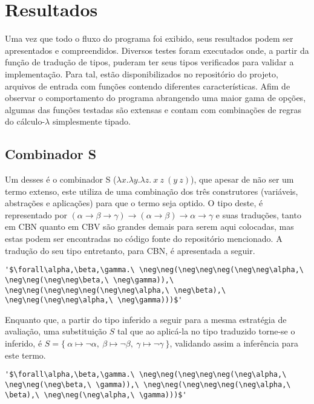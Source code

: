 \section{Resultados}\label{sec:resultados}
Uma vez que todo o fluxo do programa foi exibido, seus resultados podem ser apresentados e compreendidos.
Diversos testes foram executados onde, a partir da função de tradução de tipos, puderam ter seus tipos verificados para validar a implementação.
Para tal, estão disponibilizados no repositório do projeto, arquivos de entrada com funções contendo diferentes características.
Afim de observar o comportamento do programa abrangendo uma maior gama de opções, algumas das funções testadas são extensas e contam com combinações de regras do cálculo-$\lambda$ simplesmente tipado.

\subsection{Combinador S}
Um desses é o combinador S ($\lambda x.\lambda y.\lambda z.\ x\ z\ (y\ z)$), que apesar de não ser um termo extenso, este utiliza de uma combinação dos três construtores (variáveis, abstrações e aplicações) para que o termo seja optido.
O tipo deste, é representado por $(\alpha \to \beta \to \gamma) \to (\alpha \to \beta) \to \alpha \to \gamma$ e suas traduções, tanto em CBN quanto em CBV são grandes demais para serem aqui colocadas, mas estas podem ser encontradas no código fonte do repositório mencionado.
A tradução do seu tipo entretanto, para CBN, é apresentada a seguir.
\lstset{extendedchars=false, escapeinside=''}
\begin{lstlisting}[style=output,caption={Tradução em CBN do tipo do combinador S}]
  '$\forall\alpha,\beta,\gamma.\ \neg\neg(\neg\neg\neg(\neg\neg\alpha,\ \neg\neg(\neg\neg\beta,\ \neg\gamma)),\ \neg\neg(\neg\neg\neg(\neg\neg\alpha,\ \neg\beta),\ \neg\neg(\neg\neg\alpha,\ \neg\gamma)))$'
\end{lstlisting}
Enquanto que, a partir do tipo inferido a seguir para a mesma estratégia de avaliação, uma substituição $S$ tal que ao aplicá-la no tipo traduzido torne-se o inferido, é $S = \{\ \alpha \mapsto \neg\alpha,\ \beta \mapsto \neg\beta,\ \gamma \mapsto \neg\gamma\ \}$, validando assim a inferência para este termo.
\lstset{extendedchars=false, escapeinside=''}
\begin{lstlisting}[style=output,caption={Inferência do tipo do combinador S traduzido em CBN}]
  '$\forall\alpha,\beta,\gamma.\ \neg\neg(\neg\neg\neg(\neg\alpha,\ \neg\neg(\neg\beta,\ \gamma)),\ \neg\neg(\neg\neg\neg(\neg\alpha,\ \beta),\ \neg\neg(\neg\alpha,\ \gamma)))$'
\end{lstlisting}
